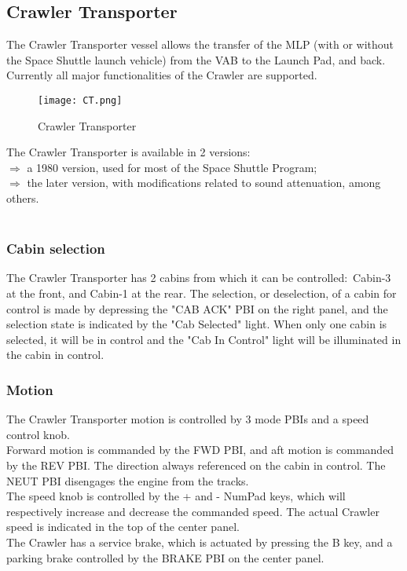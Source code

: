 \documentclass[Space_Shuttle_Vessel_Manual.tex]{subfiles}
\begin{document}
\begin{multicols*}{2}
\subsection{Crawler Transporter}
\noindent
The Crawler Transporter vessel allows the transfer of the MLP (with or without the Space Shuttle launch vehicle) from the VAB to the Launch Pad, and back. Currently all major functionalities of the Crawler are supported.
\begin{figure}[H]
  \texttt{[image: CT.png]}
  \caption{Crawler Transporter}
  \label{fig:CT}
\end{figure}
\noindent
The Crawler Transporter is available in 2 versions$\colon$\\
$\Rightarrow$ a 1980 version, used for most of the Space Shuttle Program;\\
$\Rightarrow$ the later version, with modifications related to sound attenuation, among others.\\
\\

\subsubsection{Cabin selection}
The Crawler Transporter has 2 cabins from which it can be controlled$\colon$ Cabin-3 at the front, and Cabin-1 at the rear. The selection, or deselection, of a cabin for control is made by depressing the "CAB ACK" PBI on the right panel, and the selection state is indicated by the "Cab Selected" light. When only one cabin is selected, it will be in control and the "Cab In Control" light will be illuminated in the cabin in control.
\\

\subsubsection{Motion}
The Crawler Transporter motion is controlled by 3 mode PBIs and a speed control knob.\\
Forward motion is commanded by the FWD PBI, and aft motion is commanded by the REV PBI. The direction always referenced on the cabin in control. The NEUT PBI disengages the engine from the tracks.\\
The speed knob is controlled by the + and - NumPad keys, which will respectively increase and decrease the commanded speed. The actual Crawler speed is indicated in the top of the center panel.\\
The Crawler has a service brake, which is actuated by pressing the B key, and a parking brake controlled by the BRAKE PBI on the center panel.
\\


\end{multicols*}
\end{document}
